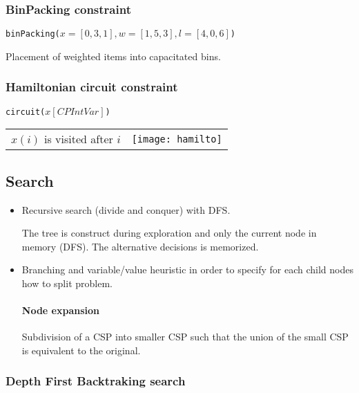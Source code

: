 \subsubsection{BinPacking constraint}
\begin{center}
    \texttt{binPacking($x=[0, 3, 1], w=[1, 5, 3], l=[4, 0, 6]$)}
\end{center}
Placement of weighted items into capacitated bins.

\subsubsection{Hamiltonian circuit constraint}
\begin{center}
    \texttt{circuit($x[CPIntVar]$)}
\end{center}

\begin{tabular}{m{5cm}m{10cm}}
$x(i)$ is visited after $i$
&
    \texttt{[image: hamilto]}
\end{tabular}


\subsection{Search}
\begin{itemize}
    \item Recursive search (divide and conquer) with DFS.
        
        The tree is construct during exploration and only the current
        node in memory (DFS). The alternative decisions is memorized.

    \item Branching and variable/value heuristic
        in order to specify for each child nodes
        how to split problem.

        \paragraph{Node expansion}
        Subdivision of a CSP into smaller CSP such that the union of the small CSP
        is equivalent to the original.

\end{itemize}

\subsubsection{Depth First Backtraking search}

